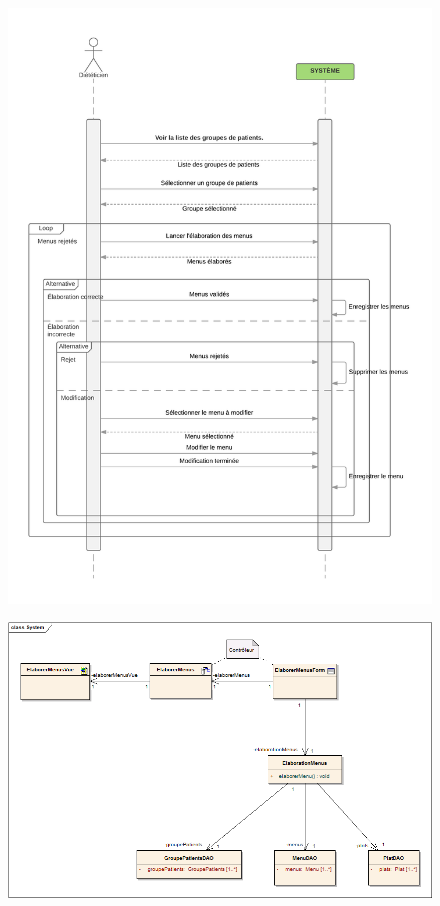 \documentclass{beamer}
\begin{document}
\begin{frame}[plain]{}
\begin{figure}
\centering
\includegraphics[scale=0.080]{../CasDUtilisations/MenuGen/Sequence/ElaborationMenus.png}
\end{figure}
\end{frame}

\begin{frame}[plain]{}
\begin{figure}
\centering
\includegraphics[scale=0.350]{../CasDUtilisations/MenuGen/Classes/EMC.png}
\end{figure}
\end{frame}
\end{document}

